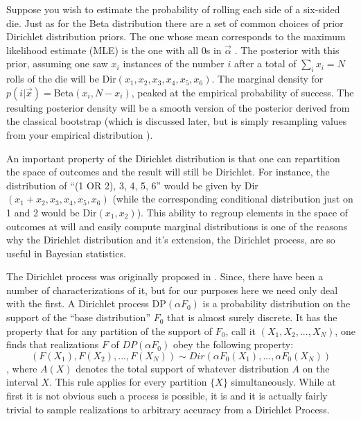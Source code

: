 Suppose you wish to estimate the probability of rolling each side of a six-sided die. Just as for the Beta distribution there are a set of common choices of prior Dirichlet distribution priors. The one whose mean corresponds to the maximum likelihood estimate (MLE) is the one with all 0s in $\vec{\alpha}$ \cite{rubin1981bayesian}. The posterior with this prior, assuming one saw $x_i$ instances of the number $i$ after a total of $\sum_i x_i = N$ rolls of the die will be Dir$(x_1,x_2,x_3,x_4,x_5,x_6)$. The marginal density for $p(i|\vec{x}) = $Beta$(x_i,N-x_i)$, peaked at the empirical probability of success. The resulting posterior density will be a smooth version of the posterior derived from the classical bootstrap (which is discussed later, but is simply resampling values from your empirical distribution \cite{efron1992bootstrap}).

An important property of the Dirichlet distribution is that one can repartition the space of outcomes and the result will still be Dirichlet. For instance, the distribution of ``(1 OR 2), 3, 4, 5, 6'' would be given by Dir$(x_1+x_2,x_3,x_4,x_5,x_6)$ (while the corresponding conditional distribution just on 1 and 2 would be Dir$(x_1,x_2)$). This ability to regroup elements in the space of outcomes at will and easily compute marginal distributions is one of the reasons why the Dirichlet distribution and it's extension, the Dirichlet process, are so useful in Bayesian statistics.

The Dirichlet process was originally proposed in \cite{Ferguson:1973}. Since, there have been a number of characterizations of it, but for our purposes here we need only deal with the first. A Dirichlet process DP$(\alpha F_0)$ is a probability distribution on the support of the ``base distribution'' $F_0$ that is almost surely discrete. It has the property that for any partition of the support of $F_0$, call it $(X_1,X_2,...,X_N)$, one finds that realizations $F$ of $DP(\alpha F_0)$ obey the following property: \[(F(X_1),F(X_2),...,F(X_N)) \sim Dir(\alpha F_0(X_1),...,\alpha F_0(X_N))\], where $A(X)$ denotes the total support of whatever distribution $A$ on the interval $X$. This rule applies for every partition $\{X\}$ simultaneously. While at first it is not obvious such a process is possible, it is and it is actually fairly trivial to sample realizations to arbitrary accuracy from a Dirichlet Process.


